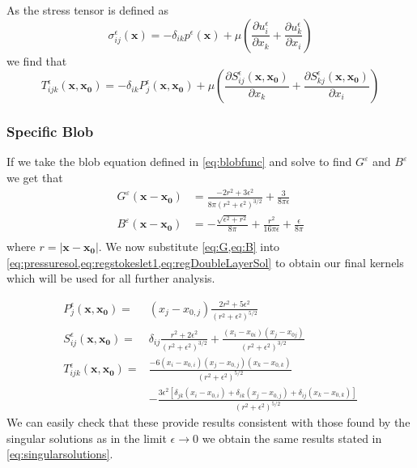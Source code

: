 As the stress tensor is defined as
\begin{equation}
\label{eq:regstress}
    \sigma_{ij}^\epsilon(\mathbf{x}) = -\delta_{ik}p^\epsilon(\mathbf{x}) + \mu\left( \frac{\partial u^\epsilon_i}{\partial x_k} + \frac{\partial u^\epsilon_k}{\partial x_i} \right)
\end{equation}
we find that
\begin{equation}
\label{eq:regDoubleLayerSol}
    T^\epsilon_{ijk}(\mathbf{x},\mathbf{x_0}) = -\delta_{ik} P^\epsilon_j(\mathbf{x},\mathbf{x_0}) + \mu\left( \frac{\partial S^\epsilon_{ij}(\mathbf{x},\mathbf{x_0})}{\partial x_k} + \frac{\partial S^\epsilon_{kj}(\mathbf{x},\mathbf{x_0})}{\partial x_i}\right)
\end{equation}

\subsubsection{Specific Blob}
If we take the blob equation defined in \cref{eq:blobfunc} and solve to find $G^\varepsilon$ and $B^\varepsilon$ we get that
\begin{subequations}
\begin{align}
    G^\varepsilon(\mathbf{x}-\mathbf{x_0}) &= \frac{-2r^2+3\epsilon^2}{8\pi(r^2+\epsilon^2)^{3/2}} + \frac{3}{8\pi\epsilon} \label{eq:G}\\
    B^\varepsilon(\mathbf{x}-\mathbf{x_0}) &= -\frac{\sqrt{\epsilon^2+r^2}}{8\pi} + \frac{r^2}{16\pi\epsilon} + \frac{\epsilon}{8\pi}\label{eq:B}\\\
\end{align}
\end{subequations}
where $r=|\mathbf{x}-\mathbf{x_0}|$. We now substitute \cref{eq:G,eq:B} into \cref{eq:pressuresol,eq:regstokeslet1,eq:regDoubleLayerSol} to obtain our final kernels which will be used for all further analysis.

\begin{subequations}
\begin{align}
    P_j^\epsilon(\mathbf{x}, \mathbf{x_0}) =& (x_j-x_{0,j})\frac{2r^2+5\epsilon^2}{(r^2+\epsilon^2)^{5/2}} \label{eq:pressuresol2}\\
    S_{ij}^\epsilon(\mathbf{x}, \mathbf{x_0}) =& \delta_{ij} \frac{r^2+2\epsilon^2}{\left( r^2 + \epsilon^2 \right)^{3/2}} + \frac{(x_i-x_{0i})(x_j-x_{0j})}{\left( r^2 + \epsilon^2 \right)^{3/2}} \label{eq:regstokeslet2} \\
    T_{ijk}^\epsilon(\mathbf{x}, \mathbf{x_0}) =& \frac{-6(x_i-x_{0,i})(x_j-x_{0,j})(x_k-x_{0,k})}{(r^2+\epsilon^2)^{5/2}} \label{eq:doublelayer2}\\
    &-\frac{3\epsilon^2[\delta_{jk}(x_i-x_{0,i}) +\delta_{ik}(x_j-x_{0,j})+\delta_{ij}(x_k-x_{0,k})]}{(r^2+\epsilon^2)^{5/2}} \nonumber
\end{align}
\end{subequations}
We can easily check that these provide results consistent with those found by the singular solutions as in the limit $\epsilon \to 0$ we obtain the same results stated in \cref{eq:singularsolutions}.

